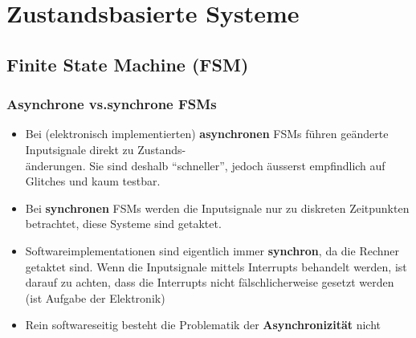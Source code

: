 \section{Zustandsbasierte Systeme}

\subsection{Finite State Machine (FSM)}
\subsubsection{Asynchrone vs.synchrone FSMs}
\begin{itemize}
  \item Bei (elektronisch implementierten) \textbf{asynchronen} FSMs führen geänderte Inputsignale direkt zu Zustands-\\änderungen. Sie sind deshalb "`schneller"', jedoch äusserst empfindlich auf Glitches und kaum testbar.
  \item Bei \textbf{synchronen} FSMs werden die Inputsignale nur zu diskreten Zeitpunkten betrachtet, diese Systeme sind getaktet.
  \item Softwareimplementationen sind eigentlich immer \textbf{synchron}, da die Rechner getaktet sind. Wenn die Inputsignale mittels Interrupts behandelt werden, ist darauf zu achten, dass die Interrupts nicht fälschlicherweise gesetzt werden (ist Aufgabe der Elektronik)
  \item Rein softwareseitig besteht die Problematik der \textbf{Asynchronizität} nicht
\end{itemize}

